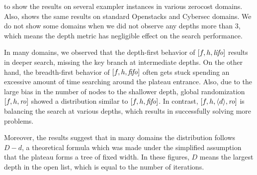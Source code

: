  to 
 show the results on several exampler
instances in various zerocost domains. Also,
  shows the same results on standard
 Openstacks and Cybersec domains. We do not show some domains when we did
not observe any depths more than 3, which means the depth metric has
negligible effect on the search performance.

In many domains, we observed that the depth-first behavior of
$[f,h,{\text{\textit{lifo}}}]$ results in deeper search, missing the key branch at
intermediate depths.  On the other hand, the breadth-first behavior of
$[f,h,{\text{\textit{fifo}}}]$ often gets stuck spending an excessive amount of time
searching around the plateau entrance.  Also, due to the large bias in
the number of nodes to the shallower depth, global randomization
$[f,h,{\text{\textit{ro}}}]$ showed a distribution similar to $[f,h,{\text{\textit{fifo}}}]$.
In contrast, $[f,h,{\left<d\right>},{\text{\textit{ro}}}]$ is balancing the search at various depths, which
results in successfully solving more problems.

Moreover, the results suggest that in many domains the distribution follows
$D-d$, a theoretical formula which was made under the simplified
assumption that the plateau forms a tree of fixed width. In these
figures, $D$ means the largest depth in the open list, which is equal to
the number of iterations.

